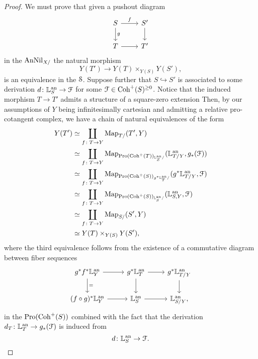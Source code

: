 \documentclass[10pt,a4paper,reqno]{amsart} %
\theoremstyle{plain}
\theoremstyle{definition}
\theoremstyle{remark}
\numberwithin{equation}{section}
\begin{document}
\begin{proof}
    We must prove that given a pushout diagram
        \[
        \begin{tikzcd}
            S \ar{r}{f} \ar{d}{g} & S' \ar{d} \\
            T \ar{r} & T'  
        \end{tikzcd}
        \]
    in the \infcat $\mathrm{AnNil}_{X/}$ the natural morphism
        \[
            Y(T') \to Y(T) \times_{Y(S)} Y(S'),  
        \]
    is an equivalence in the \infcat $\mathcal S$. Suppose further that $S \hookrightarrow S'$ is associated to some derivation
    $d \colon \mathbb L^\mathrm{an}_S \to \mathcal F$ for some $\mathcal F \in \mathrm{Coh}^+(S)^{\ge 0}$.
    Notice that the induced morphism $T \to T'$ admits a structure of a square-zero extension
     Then, by our assumptions of $Y$ being infinitesimally cartesian and admitting a relative pro-cotangent complex, we have a chain of natural equivalences of the form
        \begin{align*}
            Y(T') & \simeq \coprod_{f \colon T \to Y} \operatorname{Map}_{T/ } (T', Y) \\
                  & \simeq \coprod_{ f \colon T \to Y} \operatorname{Map}_{\mathrm{Pro}(\mathrm{Coh}^+(T))_{ \mathbb L^\mathrm{an}_Z / }}(\mathbb L^\mathrm{an}_{T/Y}, g_*(\mathcal F)) \\
                  & \simeq \coprod_{f \colon T \to Y} \operatorname{Map}_{\mathrm{Pro}(\mathrm{Coh}^+(S))_{g^* \mathbb L^\mathrm{an}_T / }} (g^*\mathbb L^\mathrm{an}_{T/Y}, \mathcal F) \\
                  & \simeq \coprod_{f \colon T \to Y } \operatorname{Map}_{\mathrm{Pro}(\mathrm{Coh}^+(S))_{\mathbb L^\mathrm{an}_S/}} (\mathbb L^\mathrm{an}_{S, Y}, \mathcal F) \\
                  & \simeq \coprod_{f \colon T \to Y} \operatorname{Map}_{S/ }(S', Y) \\
                  & \simeq Y(T) \times_{Y(S)} Y(S'),
        \end{align*}
    where the third equivalence follows from the existence of a commutative diagram between fiber sequences
        \[
        \begin{tikzcd}    
            g^* f^*\bbL\an_Y \ar{r} \ar{d}{=} & g^* \bbL\an_{T} \ar{r} \ar{d} &  g^* \bbL\an_{T/Y} \ar{d} \\
            (f\circ g)^*\bbL\an_Y \ar{r} & \bbL\an_{S} \ar{r} & \bbL\an_{S/Y},
        \end{tikzcd}
        \]
    in the \infcat $\mathrm{Pro}(\mathrm{Coh}^+(S))$ combined with the fact that the derivation $d_T \colon \mathbb L^\mathrm{an}_T \to g_*(\mathcal F)$ is induced from
        \[
            d \colon \mathbb L^\mathrm{an}_S \to \mathcal F.  
        \]
\end{proof}
\end{document}
